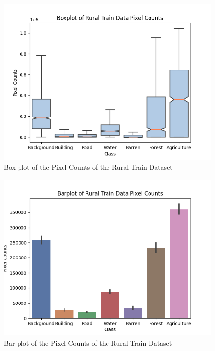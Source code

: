 \FloatBarrier
\begin{figure}[!h]
\includegraphics[width=15.0cm, height=8.5cm]{images/rural train boxplot.png}
\centering
\caption{Box plot of the Pixel Counts of the Rural Train Dataset}
\label{fig:boxplot-rural-train}
\end{figure}

\begin{figure}[!h]
\includegraphics[width=15.0cm, height=8.5cm]{images/rural train barplot.png}
\centering
\caption{Bar plot of the Pixel Counts of the Rural Train Dataset}
\label{fig:barplot-rural-train}
\end{figure}

